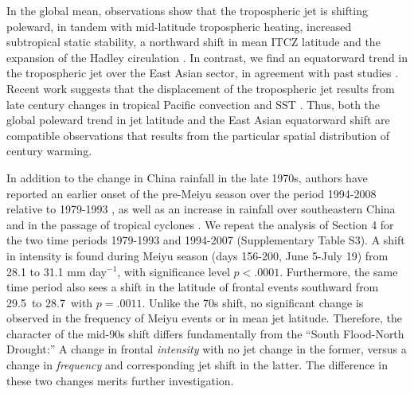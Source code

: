\documentclass[draft,grl]{AGUTeX}
\begin{document}
\begin{article}
	
	 In the global mean, observations show that the tropospheric jet is shifting poleward, in tandem with mid-latitude tropospheric heating, increased subtropical static stability, a northward shift in mean ITCZ latitude and the expansion of the Hadley circulation \citep{Fu2006,Archer2008}. In contrast, we find an equatorward trend in the tropospheric jet over the East Asian sector, in agreement with past studies \citep{Yu2007}. Recent work suggests that the displacement of the tropospheric jet results from late  century changes in tropical Pacific convection and SST  \citep{Park2014a}. Thus, both the global poleward trend in jet latitude and the East Asian equatorward shift are compatible observations that results from the particular spatial distribution of  century warming.
	 
	 In addition to the change in China rainfall in the late 1970s, authors have reported an earlier onset of the pre-Meiyu season over the period 1994-2008 relative to 1979-1993 \citep{Kajikawa2012}, as well as an increase in rainfall over southeastern China and in the passage of tropical cyclones \citep{Kwon2007,Chang2014}. We repeat the analysis of Section 4 for the two time periods 1979-1993 and 1994-2007 (Supplementary Table S3). A shift in intensity is found during Meiyu season (days 156-200, June 5-July 19) from 28.1 to 31.1 mm day$^{-1}$, with significance level $p<.0001$. Furthermore, the same time period also sees a shift in the latitude of frontal events southward from 29.5\textdegree\ to 28.7\textdegree\ with $p=.0011$. Unlike the 70s shift, no significant change is observed in the frequency of Meiyu events or in mean jet latitude. Therefore, the character of the mid-90s shift differs fundamentally from the ``South Flood-North Drought:'' A change in frontal \textit{intensity} with no jet change in the former, versus a change in \textit{frequency} and corresponding jet shift in the latter. The difference in these two changes merits further investigation.


\end{article}
\end{document}
